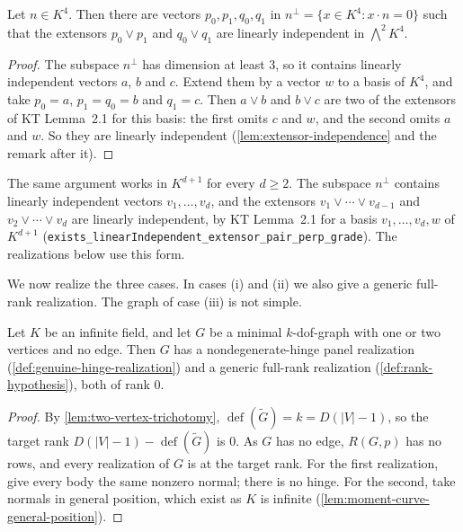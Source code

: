 \begin{lemma}
  \label{lem:extensor-pair-in-panel}
  \leanok
  Let $n \in K^4$. Then there are vectors $p_0, p_1, q_0, q_1$ in
  $n^{\perp} = \{x \in K^4 : x \cdot n = 0\}$ such that the extensors
  $p_0 \vee p_1$ and $q_0 \vee q_1$ are linearly independent in
  $\bigwedge^2 K^4$.
\end{lemma}
\begin{proof}
  \leanok
  The subspace $n^{\perp}$ has dimension at least $3$, so it contains
  linearly independent vectors $a$, $b$ and $c$. Extend them by a vector
  $w$ to a basis of $K^4$, and take $p_0 = a$, $p_1 = q_0 = b$ and
  $q_1 = c$. Then $a \vee b$ and $b \vee c$ are two of the extensors of
  KT Lemma~2.1 for this basis: the first omits $c$ and $w$, and the second
  omits $a$ and $w$. So they are linearly independent
  (\cref{lem:extensor-independence} and the remark after it).
\end{proof}

The same argument works in $K^{d+1}$ for every $d \ge 2$. The subspace
$n^{\perp}$ contains linearly independent vectors $v_1, \dots, v_d$, and
the extensors $v_1 \vee \cdots \vee v_{d-1}$ and
$v_2 \vee \cdots \vee v_d$ are linearly independent, by KT Lemma~2.1 for a
basis $v_1, \dots, v_d, w$ of $K^{d+1}$
(\texttt{exists\_\allowbreak{}linearIndependent\_\allowbreak{}extensor\_\allowbreak{}pair\_\allowbreak{}perp\_\allowbreak{}grade}).
The realizations below use this form.

We now realize the three cases. In cases (i) and (ii) we also give a
generic full-rank realization. The graph of case (iii) is not simple.

\begin{lemma}
  \label{lem:theorem-55-base-producer-empty}
  \leanok
  Let $K$ be an infinite field, and let $G$ be a minimal $k$-dof-graph
  with one or two vertices and no edge. Then $G$ has a
  nondegenerate-hinge panel realization
  (\cref{def:genuine-hinge-realization}) and a generic full-rank
  realization (\cref{def:rank-hypothesis}), both of rank $0$.
\end{lemma}
\begin{proof}
  \leanok
  By \cref{lem:two-vertex-trichotomy},
  $\operatorname{def}(\tilde G) = k = D(|V| - 1)$, so the target rank
  $D(|V| - 1) - \operatorname{def}(\tilde G)$ is $0$. As $G$ has no edge,
  $R(G,p)$ has no rows, and every realization of $G$ is at the target
  rank. For the first realization, give every body the same nonzero
  normal; there is no hinge. For the second, take normals in general
  position, which exist as $K$ is infinite
  (\cref{lem:moment-curve-general-position}).
\end{proof}


